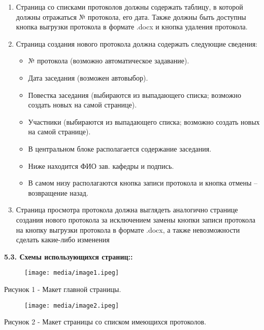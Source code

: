\documentclass[12pt,a4paper]{article}
\begin{document}
	\begin{enumerate}
		\item Страница со списками протоколов должны содержать таблицу, в которой должны отражаться № протокола, его дата. Также должны быть доступны кнопка выгрузки протокола в формате .docx и кнопка удаления протокола.
		\item Страница создания нового протокола должна содержать следующие сведения:
		\begin{itemize}
			\item № протокола (возможно автоматическое задавание).
			\item Дата заседания (возможен автовыбор).
			\item Повестка заседания (выбираются из выпадающего списка; возможно создать новых на самой странице).
			\item Участники (выбираются из выпадающего списка; возможно создать новых на самой странице).
			\item В центральном блоке располагается содержание заседания.
			\item Ниже находится ФИО зав. кафедры и подпись.
			\item В самом низу располагаются кнопка записи протокола и кнопка отмены – возвращение назад.
		\end{itemize}
		\item Страница просмотра протокола должна выглядеть аналогично странице создания нового протокола за исключением замены кнопки записи протокола на кнопку выгрузки протокола в формате .docx, а также невозможности сделать какие-либо изменения
		
	\end{enumerate}
	
	\textbf{5.3. Схемы использующихся страниц::}
	
	\begin{figure}[h]
		\centering
		\texttt{[image: media/image1.ipeg]}
	\end{figure}
	
	\begin{center}Рисунок 1 - Макет главной страницы.\end{center}
	
	\begin{figure}[h]
		\centering
		\texttt{[image: media/image2.ipeg]}
	\end{figure}
	
	\begin{center}Рисунок 2 - Макет страницы со списком имеющихся протоколов.\end{center}
	
\end{document}
